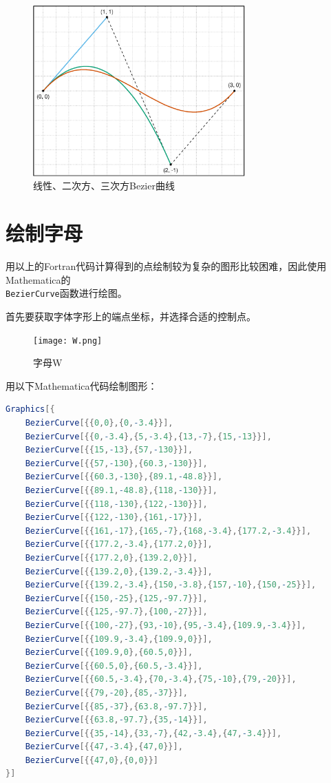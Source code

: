 \documentclass{ctexart}
\begin{document}
\begin{figure}[htbp]
    \centering
    \includegraphics[width=22em]{graph.pdf}
    \caption{线性、二次方、三次方Bezier曲线}
    \label{fig:plot2}
\end{figure}

\section{绘制字母}
用以上的Fortran代码计算得到的点绘制较为复杂的图形比较困难，因此使用Mathematica的\\ \texttt{BezierCurve}函数进行绘图。

首先要获取字体字形上的端点坐标，并选择合适的控制点。

\begin{figure}[htbp]
    \centering
    \texttt{[image: W.png]}
    \caption{字母W}
    \label{fig:plot3}
\end{figure}

用以下Mathematica代码绘制图形：
{\setmainfont{Consolas}                          %
\begin{lstlisting}[language=Mathematica,morekeywords={BezierCurve}]
Graphics[{
    BezierCurve[{{0,0},{0,-3.4}}],
    BezierCurve[{{0,-3.4},{5,-3.4},{13,-7},{15,-13}}],
    BezierCurve[{{15,-13},{57,-130}}],
    BezierCurve[{{57,-130},{60.3,-130}}],
    BezierCurve[{{60.3,-130},{89.1,-48.8}}],
    BezierCurve[{{89.1,-48.8},{118,-130}}],
    BezierCurve[{{118,-130},{122,-130}}],
    BezierCurve[{{122,-130},{161,-17}}],
    BezierCurve[{{161,-17},{165,-7},{168,-3.4},{177.2,-3.4}}],
    BezierCurve[{{177.2,-3.4},{177.2,0}}],
    BezierCurve[{{177.2,0},{139.2,0}}],
    BezierCurve[{{139.2,0},{139.2,-3.4}}],
    BezierCurve[{{139.2,-3.4},{150,-3.8},{157,-10},{150,-25}}],
    BezierCurve[{{150,-25},{125,-97.7}}],
    BezierCurve[{{125,-97.7},{100,-27}}],
    BezierCurve[{{100,-27},{93,-10},{95,-3.4},{109.9,-3.4}}],
    BezierCurve[{{109.9,-3.4},{109.9,0}}],
    BezierCurve[{{109.9,0},{60.5,0}}],
    BezierCurve[{{60.5,0},{60.5,-3.4}}],
    BezierCurve[{{60.5,-3.4},{70,-3.4},{75,-10},{79,-20}}],
    BezierCurve[{{79,-20},{85,-37}}],
    BezierCurve[{{85,-37},{63.8,-97.7}}],
    BezierCurve[{{63.8,-97.7},{35,-14}}],
    BezierCurve[{{35,-14},{33,-7},{42,-3.4},{47,-3.4}}],
    BezierCurve[{{47,-3.4},{47,0}}],
    BezierCurve[{{47,0},{0,0}}]
}]                                                           
\end{lstlisting}}
\end{document}
